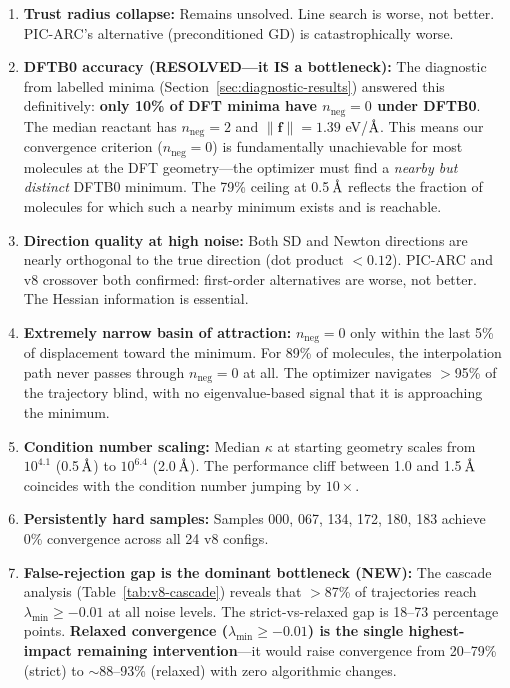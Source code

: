 \documentclass[11pt,a4paper]{article}
\newcommand{\vect}[1]{\mathbf{#1}}
\newcommand{\eval}{\lambda}
\newcommand{\angstrom}{\text{\r{A}}}
\begin{document}
\begin{enumerate}
  \item \textbf{Trust radius collapse:} Remains unsolved. Line search is worse, not better. PIC-ARC's alternative (preconditioned GD) is catastrophically worse.
  \item \textbf{DFTB0 accuracy (RESOLVED---it IS a bottleneck):} The diagnostic from labelled minima (Section~\ref{sec:diagnostic-results}) answered this definitively: \textbf{only 10\% of DFT minima have $n_\text{neg} = 0$ under DFTB0}. The median reactant has $n_\text{neg} = 2$ and $\|\vect{f}\| = 1.39$ eV/$\angstrom$. This means our convergence criterion ($n_\text{neg} = 0$) is fundamentally unachievable for most molecules at the DFT geometry---the optimizer must find a \emph{nearby but distinct} DFTB0 minimum. The 79\% ceiling at 0.5\,$\angstrom$ reflects the fraction of molecules for which such a nearby minimum exists and is reachable.
  \item \textbf{Direction quality at high noise:} Both SD and Newton directions are nearly orthogonal to the true direction (dot product $< 0.12$). PIC-ARC and v8 crossover both confirmed: first-order alternatives are worse, not better. The Hessian information is essential.
  \item \textbf{Extremely narrow basin of attraction:} $n_\text{neg} = 0$ only within the last 5\% of displacement toward the minimum. For 89\% of molecules, the interpolation path never passes through $n_\text{neg} = 0$ at all. The optimizer navigates $>$95\% of the trajectory blind, with no eigenvalue-based signal that it is approaching the minimum.
  \item \textbf{Condition number scaling:} Median $\kappa$ at starting geometry scales from $10^{4.1}$ (0.5\,$\angstrom$) to $10^{6.4}$ (2.0\,$\angstrom$). The performance cliff between 1.0 and 1.5\,$\angstrom$ coincides with the condition number jumping by $10\times$.
  \item \textbf{Persistently hard samples:} Samples 000, 067, 134, 172, 180, 183 achieve 0\% convergence across all 24 v8 configs.
  \item \textbf{False-rejection gap is the dominant bottleneck (NEW):} The cascade analysis (Table~\ref{tab:v8-cascade}) reveals that $>$87\% of trajectories reach $\eval_\text{min} \geq -0.01$ at all noise levels. The strict-vs-relaxed gap is 18--73 percentage points. \textbf{Relaxed convergence ($\eval_\text{min} \geq -0.01$) is the single highest-impact remaining intervention}---it would raise convergence from 20--79\% (strict) to $\sim$88--93\% (relaxed) with zero algorithmic changes.
\end{enumerate}
\end{document}
